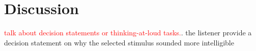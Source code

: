 \section{Discussion}

\textcolor{red}{talk about decision statements or thinking-at-loud tasks.}. the listener provide a decision statement on why the selected stimulus sounded more intelligible